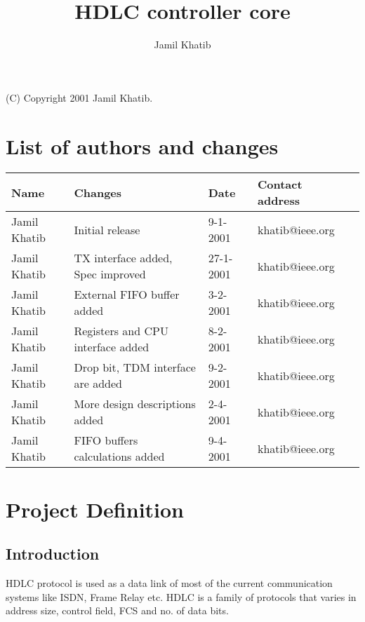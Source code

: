 \documentclass[a4paper,11pt]{article}
\author{Jamil Khatib}
\title{HDLC controller core}
\newcommand{\addauthor}[4]{#1 & #2 & #3 & #4 \\ \hline}
\begin{document}
\maketitle

\begin{center}(C) Copyright 2001 Jamil Khatib.\end{center}

\thispagestyle{empty}

\newpage


\tableofcontents

\newpage

\section{List of authors and changes}

\begin{tabular}{|l|l|l|l|l|}
\hline
Name & Changes & Date & Contact address\\
\hline
\hline 

\addauthor{Jamil Khatib}{Initial release}{9-1-2001}{khatib@ieee.org}
\addauthor{Jamil Khatib}{TX interface added, Spec improved}{27-1-2001}{khatib@ieee.org}
\addauthor{Jamil Khatib}{External FIFO buffer added}{3-2-2001}{khatib@ieee.org}
\addauthor{Jamil Khatib}{Registers and CPU interface added}{8-2-2001}{khatib@ieee.org}
\addauthor{Jamil Khatib}{Drop bit, TDM interface are added}{9-2-2001}{khatib@ieee.org}
\addauthor{Jamil Khatib}{More design descriptions added}{2-4-2001}{khatib@ieee.org}
\addauthor{Jamil Khatib}{FIFO buffers calculations added}{9-4-2001}{khatib@ieee.org}


\end{tabular}

\newpage

\section{Project Definition}

\subsection{Introduction}
HDLC protocol is used as a data link of most of the current communication systems like ISDN, Frame Relay etc.  HDLC is a family of protocols that varies in address size, control field, FCS and no. of data bits.
\end{document}
